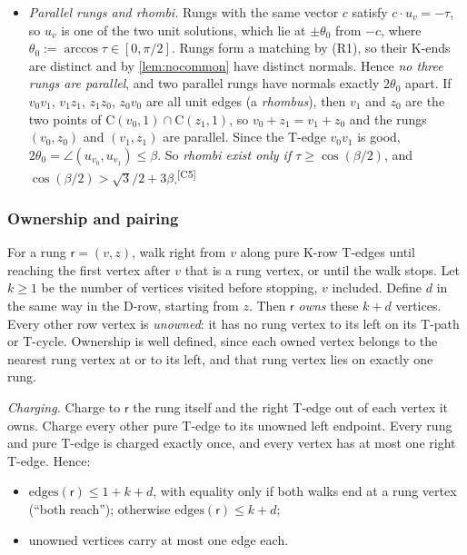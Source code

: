 \documentclass[11pt]{amsart}
\theoremstyle{definition}
\theoremstyle{remark}
\newcommand{\Cc}{\mathrm{C}}      %
\newcommand{\chk}[1]{\textsuperscript{[#1]}}
\begin{document}
\begin{itemize}[leftmargin=2em]
\item[(R3)] \emph{Parallel rungs and rhombi.} Rungs with the same vector $c$ satisfy $c\cdot u_v=-\tau$, so $u_v$ is one of the two unit solutions, which lie at $\pm\theta_0$ from $-c$, where $\theta_0:=\arccos\tau\in[0,\pi/2]$. Rungs form a matching by (R1), so their K-ends are distinct and by \cref{lem:nocommon} have distinct normals. Hence \emph{no three rungs are parallel}, and two parallel rungs have normals exactly $2\theta_0$ apart. If $v_0v_1$, $v_1z_1$, $z_1z_0$, $z_0v_0$ are all unit edges (a \emph{rhombus}), then $v_1$ and $z_0$ are the two points of $\Cc(v_0,1)\cap\Cc(z_1,1)$, so $v_0+z_1=v_1+z_0$ and the rungs $(v_0,z_0)$ and $(v_1,z_1)$ are parallel. Since the T-edge $v_0v_1$ is good, $2\theta_0=\angle(u_{v_0},u_{v_1})\le\beta$. So \emph{rhombi exist only if $\tau\ge\cos(\beta/2)$}, and $\cos(\beta/2)>\sqrt3/2+3\beta$.\chk{C5}
\end{itemize}

\subsubsection{Ownership and pairing}
For a rung $\mathsf r=(v,z)$, walk right from $v$ along pure K-row T-edges until reaching the first vertex after $v$ that is a rung vertex, or until the walk stops. Let $k\ge1$ be the number of vertices visited before stopping, $v$ included. Define $d$ in the same way in the D-row, starting from $z$. Then $\mathsf r$ \emph{owns} these $k+d$ vertices. Every other row vertex is \emph{unowned}: it has no rung vertex to its left on its T-path or T-cycle. Ownership is well defined, since each owned vertex belongs to the nearest rung vertex at or to its left, and that rung vertex lies on exactly one rung.

\emph{Charging.} Charge to $\mathsf r$ the rung itself and the right T-edge out of each vertex it owns. Charge every other pure T-edge to its unowned left endpoint. Every rung and pure T-edge is charged exactly once, and every vertex has at most one right T-edge. Hence:
\begin{itemize}[leftmargin=2em]
\item $\mathrm{edges}(\mathsf r)\le1+k+d$, with equality only if both walks end at a rung vertex (``both reach''); otherwise $\mathrm{edges}(\mathsf r)\le k+d$;
\item unowned vertices carry at most one edge each.
\end{itemize}
\end{document}
